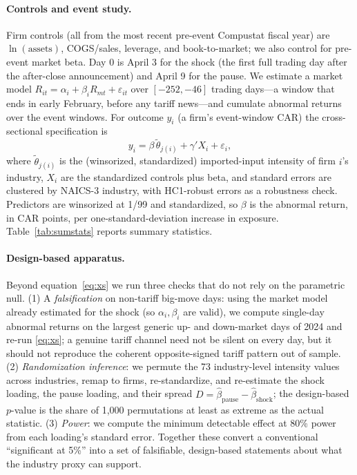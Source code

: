 \documentclass[12pt]{article}
\begin{document}
\paragraph{Controls and event study.} Firm controls (all from the most recent pre-event
Compustat fiscal year) are $\ln(\text{assets})$, COGS/sales, leverage, and book-to-market;
we also control for pre-event market beta. Day 0 is April 3 for the shock (the first full
trading day after the after-close announcement) and April 9 for the pause. We estimate a
market model $R_{it}=\alpha_i+\beta_i R_{mt}+\varepsilon_{it}$ over $[-252,-46]$ trading
days---a window that ends in early February, before any tariff news---and cumulate abnormal
returns over the event windows. For outcome $y_i$ (a firm's event-window CAR) the
cross-sectional specification is
\begin{equation}
y_i = \beta\, \tilde\theta_{j(i)} + \gamma' X_i + \varepsilon_i,
\label{eq:xs}
\end{equation}
where $\tilde\theta_{j(i)}$ is the (winsorized, standardized) imported-input intensity of firm
$i$'s industry, $X_i$ are the standardized controls plus beta, and standard errors are
clustered by NAICS-3 industry, with HC1-robust errors as a robustness check. Predictors are
winsorized at 1/99 and standardized, so $\beta$ is the abnormal return, in CAR points, per
one-standard-deviation increase in exposure. Table~\ref{tab:sumstats} reports summary
statistics.

\paragraph{Design-based apparatus.} Beyond equation~\eqref{eq:xs} we run three checks that do
not rely on the parametric null. (1) A \emph{falsification} on non-tariff big-move days: using
the market model already estimated for the shock (so $\alpha_i,\beta_i$ are valid), we compute
single-day abnormal returns on the largest generic up- and down-market days of 2024 and re-run
\eqref{eq:xs}; a genuine tariff channel need not be silent on every day, but it should not
reproduce the coherent opposite-signed tariff pattern out of sample. (2) \emph{Randomization
inference}: we permute the 73 industry-level intensity values across industries, remap to
firms, re-standardize, and re-estimate the shock loading, the pause loading, and their spread
$D=\hat\beta_{\text{pause}}-\hat\beta_{\text{shock}}$; the design-based $p$-value is the share
of 1{,}000 permutations at least as extreme as the actual statistic. (3) \emph{Power}: we
compute the minimum detectable effect at 80\% power from each loading's standard error.
Together these convert a conventional ``significant at 5\%'' into a set of falsifiable,
design-based statements about what the industry proxy can support.
\end{document}
